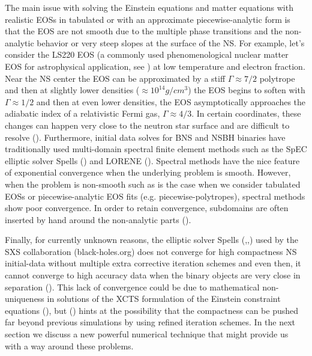 The main issue with solving the Einstein equations and matter equations with realistic EOSs in tabulated or with an approximate piecewise-analytic form is that the EOS are not smooth due to the multiple phase transitions and the non-analytic behavior or very steep slopes at the surface of the NS. For example, let's consider the LS220 EOS (a commonly used phenomenological nuclear matter EOS for astrophysical application, see \cite{lattimer1991generalized}) at low temperature and electron fraction. Near the NS center the EOS can be approximated by a stiff $\Gamma \approx 7/2$ polytrope and then at slightly lower densities ($\approx 10^{14} g/cm^{3}$) the EOS begins to soften with $\Gamma \approx 1/2$ and then at even lower densities, the EOS asymptotically approaches the adiabatic index of a relativistic Fermi gas, $\Gamma \approx 4/3$. In certain coordinates, these changes can happen very close to the neutron star surface and are difficult to resolve (\cite{deaton2013black}). Furthermore, initial data solves for BNS and NSBH binaries have traditionally used multi-domain spectral finite element methods such as the SpEC elliptic solver Spells (\cite{pfeiffer2003multidomain}) and LORENE (\cite{gourgoulhon2001quasiequilibrium}). Spectral methods have the nice feature of exponential convergence when the underlying problem is smooth. However, when the problem is non-smooth such as is the case when we consider tabulated EOSs or piecewise-analytic EOS fits (e.g. piecewise-polytropes), spectral methods show poor convergence. In order to retain convergence, subdomains are often inserted by hand around the non-analytic parts (\cite{deaton2013black}). 

Finally, for currently unknown reasons, the elliptic solver Spells (\cite{pfeiffer2003multidomain},\cite{foucart2008initial},\cite{henriksson2014initial}) used by the SXS collaboration (black-holes.org) does not converge for high compactness NS initial-data without multiple extra corrective iteration schemes and even then, it cannot converge to high accuracy data when the binary objects are very close in separation (\cite{henriksson2014initial}). This lack of convergence could be due to mathematical non-uniqueness in solutions of the XCTS formulation of the Einstein constraint equations (\cite{cordero2009improved}), but (\cite{henriksson2014initial}) hints at the possibility that the compactness can be pushed far beyond previous simulations by using refined iteration schemes. In the next section we discuss a new powerful numerical technique that might provide us with a way around these problems.

